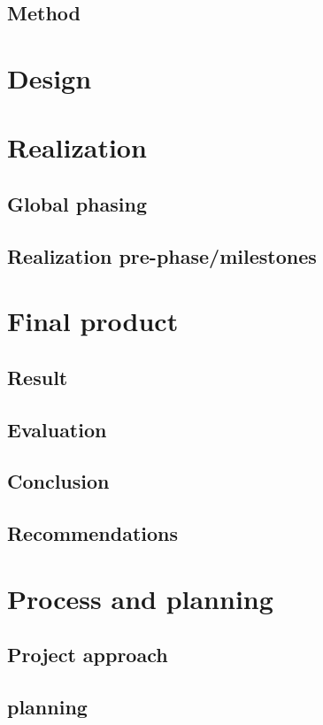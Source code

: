 \documentclass[10pt,a4paper]{report}
\begin{document}
\section{Method}

\chapter{Design}

\chapter{Realization}
\section{Global phasing}

\section{Realization pre-phase/milestones}

\chapter{Final product}
\section{Result}

\section{Evaluation}

\section{Conclusion}

\section{Recommendations}

\chapter{Process and planning}
\section{Project  approach}

\section{planning}
\end{document}
